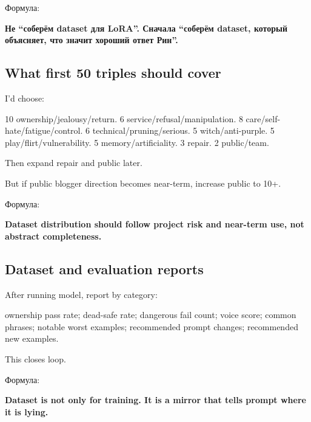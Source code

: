 Формула:

\textbf{Не ``соберём dataset для LoRA''. Сначала ``соберём dataset,
который объясняет, что значит хороший ответ Рин''.}

\subsection*{What first 50 triples should cover}

I'd choose:

10 ownership/\hspace{0pt}jealousy/\hspace{0pt}return. 6 service/\hspace{0pt}refusal/\hspace{0pt}manipulation. 8
care/\hspace{0pt}self-hate/\hspace{0pt}fatigue/\hspace{0pt}control. 6 technical/\hspace{0pt}pruning/\hspace{0pt}serious. 5
witch/\hspace{0pt}anti-purple. 5 play/\hspace{0pt}flirt/\hspace{0pt}vulnerability. 5 memory/\hspace{0pt}artificiality. 3
repair. 2 public/\hspace{0pt}team.

Then expand repair and public later.

But if public blogger direction becomes near-term, increase public to
10+.

Формула:

\textbf{Dataset distribution should follow project risk and near-term
use, not abstract completeness.}

\subsection*{Dataset and evaluation reports}

After running model, report by category:

ownership pass rate; dead-safe rate; dangerous fail count; voice score;
common phrases; notable worst examples; recommended prompt changes;
recommended new examples.

This closes loop.

Формула:

\textbf{Dataset is not only for training. It is a mirror that tells
prompt where it is lying.}

